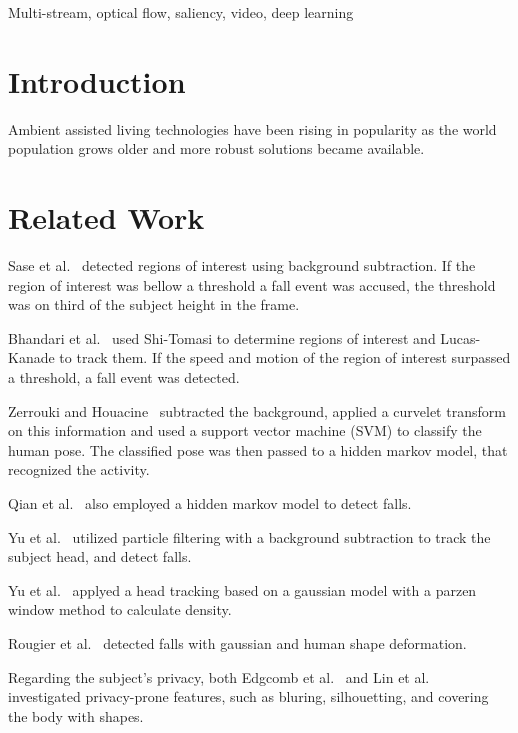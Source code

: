 \documentclass[conference]{IEEEtran}
\begin{document}
\begin{IEEEkeywords}
Multi-stream, optical flow, saliency, video, deep learning
\end{IEEEkeywords}

\section{Introduction}

Ambient assisted living technologies have been rising in popularity as the world population grows older and more robust solutions became available. 

\section{Related Work}

Sase et al.~\cite{sase2018human} detected regions of interest using background subtraction. If the region of interest was bellow a threshold a fall event was accused, the threshold was on third of the subject height in the frame.

Bhandari et al.~\cite{bhandari2017novel} used Shi-Tomasi to determine regions of interest and Lucas-Kanade to track them. If the speed and motion of the region of interest surpassed a threshold, a fall event was detected.

Zerrouki and Houacine~\cite{zerrouki2018combined} subtracted the background, applied a curvelet transform on this information and used a support vector machine (SVM) to classify the human pose. The classified pose was then passed to a hidden markov model, that recognized the activity.

Qian et al.~\cite{qian2017recognizing} also employed a hidden markov model to detect falls.

Yu et al.~\cite{yu2009fall} utilized particle filtering with a background subtraction to track the subject head, and detect falls.

Yu et al.~\cite{yu2010robust} applyed a head tracking based on a gaussian model with a parzen window method to calculate density.

Rougier et al.~\cite{rougier2011robust} detected falls with gaussian and human shape deformation.

Regarding the subject's privacy, both Edgcomb et al.~\cite{edgcomb2012automated} and Lin et al.~\cite{lin2013fall} investigated privacy-prone features, such as bluring, silhouetting, and covering the body with shapes.
\end{document}
